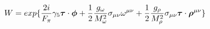 \begin{equation}
W= exp\{\frac{2i}{F_\pi} \gamma_5 \mbox{\boldmath$\tau$}\cdot \mbox{\boldmath$ \phi$} + \frac{1}{2}\frac{g_\omega}{M_\omega^2} \sigma_{\mu\nu} \omega^{\mu\nu} + \frac{1}{2} \frac{g_\rho}{M_\rho^2}\sigma_{\mu\nu} \mbox{\boldmath$\tau$}\cdot \mbox{\boldmath$\rho$}^{\mu\nu}\}   
\end{equation}

